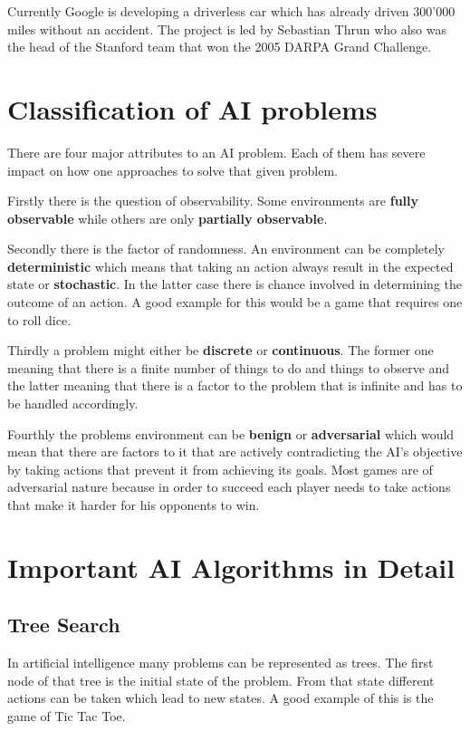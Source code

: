 Currently Google is developing a driverless car which has already driven 300'000 miles without an accident. The project is led by Sebastian Thrun who also was the head of the Stanford team that won the 2005 DARPA Grand Challenge.

\newpage
\section{Classification of AI problems}

There are four major attributes to an AI problem. Each of them has severe impact on how one approaches to solve that given problem.
\begin{description}
\item Firstly there is the question of observability. Some environments are {\bf fully observable} while others are only {\bf partially observable}.
\item Secondly there is the factor of randomness. An environment can be completely {\bf deterministic} which means that taking an action always result in the expected state or {\bf stochastic}. In the latter case there is chance involved in determining the outcome of an action. A good example for this would be a game that requires one to roll dice.
\item Thirdly a problem might either be {\bf discrete} or {\bf continuous}. The former one meaning that there is a finite number of things to do and things to observe and the latter meaning that there is a factor to the problem that is infinite and has to be handled accordingly.
\item Fourthly the problems environment can be {\bf benign} or {\bf adversarial} which would mean that there are factors to it that are actively contradicting the AI's objective by taking actions that prevent it from achieving its goals. Most games are of adversarial nature because in order to succeed each player needs to take actions that make it harder for his opponents to win.
\end{description}

\newpage
\section{Important AI Algorithms in Detail}
\subsection{Tree Search}

In artificial intelligence many problems can be represented as trees. The first node of that tree is the initial state of the problem. From that state different actions can be taken which lead to new states. A good example of this is the game of Tic Tac Toe.

